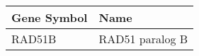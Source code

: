 \begin{tabular}{ll}
\toprule
Gene Symbol &            Name \\
\midrule
     RAD51B & RAD51 paralog B \\
\bottomrule
\end{tabular}
